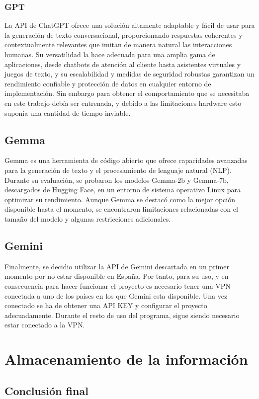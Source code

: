 \subsubsection{GPT}
La API de ChatGPT ofrece una solución altamente adaptable y fácil de usar para la generación de texto conversacional, proporcionando respuestas coherentes y contextualmente relevantes que imitan de manera natural las interacciones humanas. Su versatilidad la hace adecuada para una amplia gama de aplicaciones, desde chatbots de atención al cliente hasta asistentes virtuales y juegos de texto, y su escalabilidad y medidas de seguridad robustas garantizan un rendimiento confiable y protección de datos en cualquier entorno de implementación. Sin embargo para obtener el comportamiento que se necesitaba en este trabajo debía ser entrenada, y debido a las limitaciones hardware esto suponía una cantidad de tiempo inviable. 
\subsection{Gemma}
Gemma es una herramienta de código abierto que ofrece capacidades avanzadas para la generación de texto y el procesamiento de lenguaje natural (NLP). Durante su evaluación, se probaron los modelos Gemma-2b y Gemma-7b, descargados de Hugging Face, en un entorno de sistema operativo Linux para optimizar su rendimiento. Aunque Gemma se destacó como la mejor opción disponible hasta el momento, se encontraron limitaciones relacionadas con el tamaño del modelo y algunas restricciones adicionales. 
\subsection{Gemini}
Finalmente, se decidio utilizar la API de Gemini descartada en un primer momento por no estar disponible en España. Por tanto, para su uso, y en consecuencia para hacer funcionar el proyecto es necesario tener una VPN conectada a uno de los países en los que Gemini esta disponible. Una vez conectado se ha de obtener una API KEY y configurar el proyecto adecuadamente. Durante el resto de uso del programa, sigue siendo necesario estar conectado a la VPN.
\section{Almacenamiento de la información}
\subsection{Conclusión final}